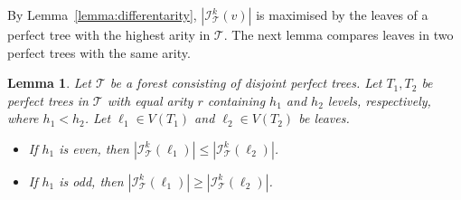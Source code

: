\documentclass[11pt]{article}
\newtheorem{lemma}[theorem]{Lemma}
\theoremstyle{definition}
\newcommand{\cI}{\mathcal{I}}
\begin{document}
By Lemma~\ref{lemma:differentarity}, $|\cI_{\mathcal{T}}^k(v)|$ is maximised by the leaves of a perfect tree with the highest arity in $\mathcal{T}$. The next lemma compares leaves in two perfect trees with the same arity. 
\begin{lemma}\label{lemma:samearity}
Let $\mathcal{T}$ be a forest consisting of disjoint perfect trees. Let $T_1, T_2$ be perfect trees in $\mathcal{T}$ with equal arity $r$ containing $h_1$ and $h_2$ levels, respectively, where $h_1 < h_2$. Let $\ell_1 \in V(T_1)$ and $\ell_2 \in V(T_2)$ be leaves.
\begin{itemize}
    \item If $h_1$ is even, then $|\mathcal{I}_{\mathcal{T}}^{k}(\ell_1)| \le |\mathcal{I}_{\mathcal{T}}^{k}(\ell_2)|$.
    \item If $h_1$ is odd, then $|\mathcal{I}_{\mathcal{T}}^{k}(\ell_1)| \ge |\mathcal{I}_{\mathcal{T}}^{k}(\ell_2)|$.
\end{itemize}
\end{lemma}
\end{document}
